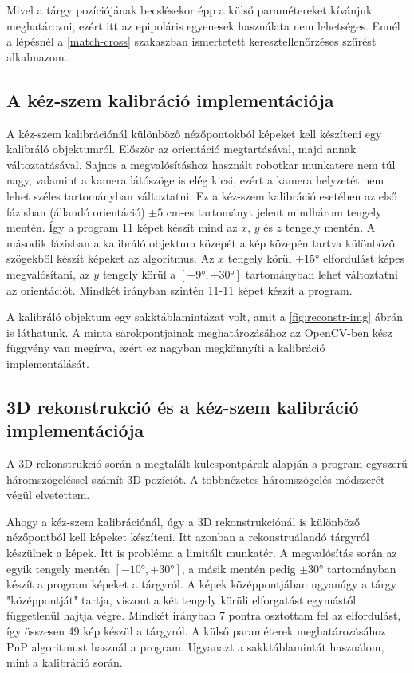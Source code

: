 Mivel a tárgy pozíciójának becslésekor épp a külső paramétereket kívánjuk meghatározni, ezért itt az epipoláris egyenesek használata nem lehetséges. Ennél a lépésnél a \ref{match-cross} szakaszban ismertetett keresztellenőrzéses szűrést alkalmazom.

\subsection{A kéz-szem kalibráció implementációja}

A kéz-szem kalibrációnál különböző nézőpontokból képeket kell készíteni egy kalibráló objektumról. Először az orientáció megtartásával, majd annak változtatásával. Sajnos a megvalósításhoz használt robotkar munkatere nem túl nagy, valamint a kamera látószöge is elég kicsi, ezért a kamera helyzetét nem lehet széles tartományban változtatni. Ez a kéz-szem kalibráció esetében az első fázisban (állandó orientáció) $\pm 5$ cm-es tartományt jelent mindhárom tengely mentén. Így a program 11 képet készít mind az $x$, $y$ és $z$ tengely mentén. A második fázisban a kalibráló objektum közepét a kép közepén tartva különböző szögekből készít képeket az algoritmus. Az $x$ tengely körül $\pm 15°$ elfordulást képes megvalósítani, az $y$ tengely körül a $\left[-9°, +30°\right]$ tartományban lehet változtatni az orientációt. Mindkét irányban szintén 11-11 képet készít a program.

A kalibráló objektum egy sakktáblamintázat volt, amit a \ref{fig:reconstr-img} ábrán is láthatunk. A minta sarokpontjainak meghatározásához az OpenCV-ben kész függvény van megírva, ezért ez nagyban megkönnyíti a kalibráció implementálását.

\subsection{3D rekonstrukció és a kéz-szem kalibráció implementációja}

A 3D rekonstrukció során a megtalált kulcspontpárok alapján a program egyszerű háromszögeléssel számít 3D pozíciót. A többnézetes háromszögelés módszerét végül elvetettem. 

Ahogy a kéz-szem kalibrációnál, úgy a 3D rekonstrukciónál is különböző nézőpontból kell képeket készíteni. Itt azonban a rekonstruálandó tárgyról készülnek a képek. Itt is probléma a limitált munkatér. A megvalósítás során az egyik tengely mentén $\left[-10°, +30°\right]$, a másik mentén pedig $\pm 30°$ tartományban készít a program képeket a tárgyról. A képek középpontjában ugyanúgy a tárgy "középpontját" tartja, viszont a két tengely körüli elforgatást egymástól függetlenül hajtja végre. Mindkét irányban 7 pontra osztottam fel az elfordulást, így összesen 49 kép készül a tárgyról. A külső paraméterek meghatározásához PnP algoritmust használ a program. Ugyanazt a sakktáblamintát használom, mint a kalibráció során.


